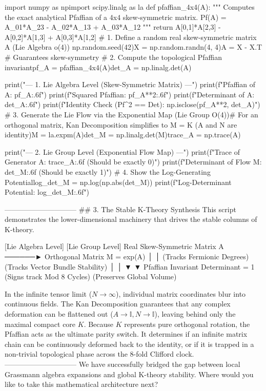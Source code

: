 import numpy as npimport scipy.linalg as la
def pfaffian_4x4(A):
    """
    Computes the exact analytical Pfaffian of a 4x4 skew-symmetric matrix.
    Pf(A) = A_01*A_23 - A_02*A_13 + A_03*A_12
    """
    return A[0,1]*A[2,3] - A[0,2]*A[1,3] + A[0,3]*A[1,2]
# 1. Define a random real skew-symmetric matrix A (Lie Algebra o(4))
np.random.seed(42)X = np.random.randn(4, 4)A = X - X.T  # Guarantees skew-symmetry
# 2. Compute the topological Pfaffian invariantpf_A = pfaffian_4x4(A)det_A = np.linalg.det(A)

print("--- 1. Lie Algebra Level (Skew-Symmetric Matrix) ---")
print(f"Pfaffian of A: {pf_A:.6f}")
print(f"Squared Pfaffian: {pf_A**2:.6f}")
print(f"Determinant of A: {det_A:.6f}")
print(f"Identity Check (Pf^2 == Det): {np.isclose(pf_A**2, det_A)}")
# 3. Generate the Lie Flow via the Exponential Map (Lie Group O(4))# For an orthogonal matrix, Kan Decomposition simplifies to M = K (A and N are identity)M = la.expm(A)det_M = np.linalg.det(M)trace_A = np.trace(A)

print("\n--- 2. Lie Group Level (Exponential Flow Map) ---")
print(f"Trace of Generator A: {trace_A:.6f} (Should be exactly 0)")
print(f"Determinant of Flow M: {det_M:.6f} (Should be exactly 1)")
# 4. Show the Log-Generating Potentiallog_det_M = np.log(np.abs(det_M))
print(f"Log-Determinant Potential: {log_det_M:.6f}")

------------------------------
## 3. The Stable K-Theory Synthesis
This script demonstrates the lower-dimensional machinery that drives the stable columns of K-theory.

               [Lie Algebra Level]                    [Lie Group Level]
          Real Skew-Symmetric Matrix A  ──────►   Orthogonal Matrix M = exp(A)
                       │                                      │
          (Tracks Fermionic Degrees)               (Tracks Vector Bundle Stability)
                       │                                      │
                       ▼                                      ▼
               Pfaffian Invariant                      Determinant = 1
         (Signs track Mod 8 Cycles)              (Preserves Global Volume)

In the infinite tensor limit ($N \rightarrow \infty$), individual matrix coordinates blur into continuous fields. The Kan Decomposition guarantees that any complex deformation can be flattened out ($A \rightarrow \mathbb{I}, N \rightarrow \mathbb{I}$), leaving behind only the maximal compact core $K$.
Because $K$ represents pure orthogonal rotation, the Pfaffian acts as the ultimate parity switch. It determines if an infinite matrix chain can be continuously deformed back to the identity, or if it is trapped in a non-trivial topological phase across the 8-fold Clifford clock.
------------------------------
We have successfully bridged the gap between local Grassmann algebra expansions and global K-theory stability. Where would you like to take this mathematical architecture next?

